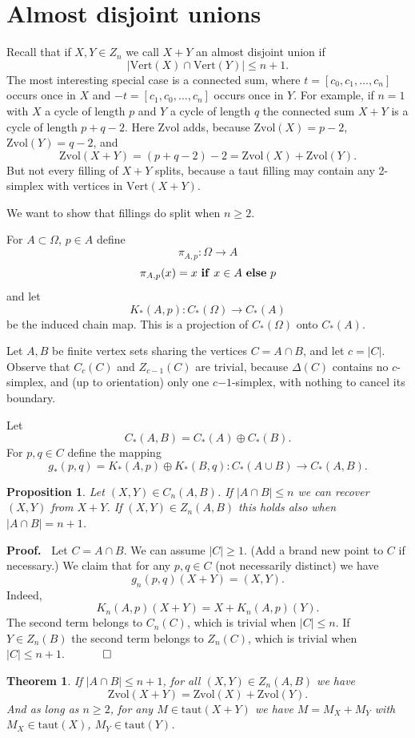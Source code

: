 \documentclass[12pt]{article}
\newtheorem{theorem}{Theorem}
\newtheorem{prop}{Proposition}
\newcommand{\proofstart}{{\noindent \bf Proof.\ }}
\newcommand{\proofend}{$\quad \qed$}
\newcommand{\kw}{\mathrm}
\newcommand{\vertices}{\kw{Vert}}
\newcommand{\taut}{\kw{taut}}
\newcommand{\Zvol}{\kw{Zvol}}
\newcommand{\kwstyle}{\bf}
\newcommand{\IF}{{\ \kwstyle{if}\ }}
\newcommand{\ELSE}{{\ \kwstyle{else}\ }}
\newcommand{\direct}{\oplus}
\newcommand{\mns}{\mathord{-}}
\begin{document}
\section{Almost disjoint unions}

Recall that if $X,Y \in Z_n$ we call $X+Y$ an almost disjoint union
if
\[
|\vertices(X) \cap \vertices(Y)| \leq n+1
.\]
The most interesting special case is a connected sum,
where $t=[c_0,c_1,\ldots,c_n]$ occurs once in $X$ and
$-t=[c_1,c_0,\ldots,c_n]$ occurs once in $Y$.
For example, if $n=1$ with $X$ a cycle of length $p$
and $Y$ a cycle of length $q$
the connected sum $X+Y$ is
a cycle of length $p+q-2$.
Here
$\Zvol$ adds, because
$\Zvol(X)=p-2$,
$\Zvol(Y) = q-2$,
and
\[
\Zvol(X+Y) = (p+q-2)-2 = \Zvol(X)+\Zvol(Y)
.
\]
But not every filling of $X+Y$ splits, because a taut filling
may contain any 2-simplex with vertices in $\vertices(X+Y)$.

We want to show that fillings do split when $n \geq 2$.

For $A \subset \Omega$, $p \in A$ define
\[
\pi_{A,p}: \Omega \to A
\]
\[
\pi_{A,p}(x) = x \IF x \in A \ELSE p
\]
and let
\[
K_*(A,p): C_*(\Omega) \to C_*(A)
\]
be the induced chain map.
This is a projection of $C_*(\Omega)$ onto $C_*(A)$.

Let $A,B$ be finite vertex sets sharing the vertices
$C = A \cap B$,
and let $c=|C|$.
Observe that
$C_c(C)$ and $Z_{c-1}(C)$ are trivial,
because $\Delta(C)$ contains no $c$-simplex,
and (up to orientation) only one $c\mns 1$-simplex,
with nothing to cancel its boundary.

Let
\[
C_*(A,B) = C_*(A) \direct C_*(B)
.
\]
For $p,q \in C$ define the mapping
\[
g_*(p,q) = K_*(A,p) \direct K_*(B,q):
C_*(A \cup B) \to C_*(A,B)
.
\]

\begin{prop} \label{recover}
Let $(X,Y) \in C_n(A,B)$.
If $|A \cap B| \leq n$
we can recover $(X,Y)$ from $X+Y$.
If $(X,Y) \in Z_n(A,B)$ this holds also when $|A \cap B|  = n+1$.
\end{prop}

\proofstart
Let $C=A \cap B$.
We can assume $|C| \geq 1$.
(Add a brand new point to $C$ if necessary.)
We claim that
for any $p,q \in C$
(not necessarily distinct) we have
\[
g_n(p,q)(X+Y)=(X,Y)
.
\]
Indeed,
\[
K_n(A,p)(X+Y) = X + K_n(A,p)(Y)
.
\]
The second term belongs to $C_n(C)$,
which is trivial when $|C| \leq n$.
If $Y \in Z_n(B)$ the second term belongs to $Z_n(C)$,
which is trivial when $|C| \leq n+1$.
\proofend


\begin{theorem} \label{th1}
If $|A \cap B| \leq n+1$,
for all $(X,Y) \in Z_n(A,B)$ we have
\[
\Zvol(X+Y) = \Zvol(X)+\Zvol(Y)
.
\]
And as long as $n \geq 2$,
for any $M \in \taut(X+Y)$ 
we have $M = M_X + M_Y$
with $M_X \in \taut(X)$, $M_Y \in \taut(Y)$.
\end{theorem}
\end{document}
